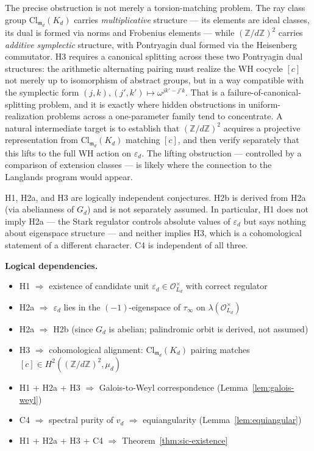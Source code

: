 \documentclass[12pt]{article}
\theoremstyle{plain}
\theoremstyle{definition}
\theoremstyle{remark}
\newcommand{\OO}{\mathcal{O}}
\newcommand{\eps}{\varepsilon}
\newcommand{\bZ}{\mathbb{Z}}
\begin{document}
The precise obstruction is not merely a torsion-matching problem. The ray class group $\mathrm{Cl}_{\mathfrak{m}_d}(K_d)$ carries \emph{multiplicative} structure — its elements are ideal classes, its dual is formed via norms and Frobenius elements — while $(\bZ/d\bZ)^2$ carries \emph{additive symplectic} structure, with Pontryagin dual formed via the Heisenberg commutator. H3 requires a canonical splitting across these two Pontryagin dual structures: the arithmetic alternating pairing must realize the WH cocycle $[c]$ not merely up to isomorphism of abstract groups, but in a way compatible with the symplectic form $(j,k),(j',k') \mapsto \omega^{jk'-j'k}$. That is a failure-of-canonical-splitting problem, and it is exactly where hidden obstructions in uniform-realization problems across a one-parameter family tend to concentrate. A natural intermediate target is to establish that $(\bZ/d\bZ)^2$ acquires a projective representation from $\mathrm{Cl}_{\mathfrak{m}_d}(K_d)$ matching $[c]$, and then verify separately that this lifts to the full WH action on $\eps_d$. The lifting obstruction — controlled by a comparison of extension classes — is likely where the connection to the Langlands program would appear.

H1, H2a, and H3 are logically independent conjectures. H2b is derived from H2a (via abelianness of $G_d$) and is not separately assumed. In particular, H1 does not imply H2a — the Stark regulator controls absolute values of $\eps_d$ but says nothing about eigenspace structure — and neither implies H3, which is a cohomological statement of a different character. C4 is independent of all three.

\medskip
\noindent\textbf{Logical dependencies.}
\begin{itemize}
  \item H1 $\Rightarrow$ existence of candidate unit $\eps_d \in \OO_{L_d}^\times$ with correct regulator
  \item H2a $\Rightarrow$ $\eps_d$ lies in the $(-1)$-eigenspace of $\tau_\infty$ on $\lambda(\OO_{L_d}^\times)$
  \item H2a $\Rightarrow$ H2b (since $G_d$ is abelian; palindromic orbit is derived, not assumed)
  \item H3 $\Rightarrow$ cohomological alignment: $\mathrm{Cl}_{\mathfrak{m}_d}(K_d)$ pairing matches $[c] \in H^2((\bZ/d\bZ)^2, \mu_d)$
  \item H1 + H2a + H3 $\Rightarrow$ Galois-to-Weyl correspondence (Lemma~\ref{lem:galois-weyl})
  \item C4 $\Rightarrow$ spectral purity of $v_d$ $\Rightarrow$ equiangularity (Lemma~\ref{lem:equiangular})
  \item H1 + H2a + H3 + C4 $\Rightarrow$ Theorem~\ref{thm:sic-existence}
\end{itemize}
\end{document}
